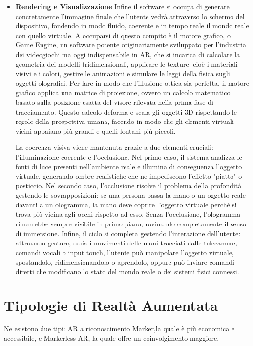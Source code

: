 \begin{itemize}
    \item \textbf{Rendering e Visualizzazione} \newline
    Infine il software si occupa di generare concretamente l'immagine finale che l'utente vedrà attraverso lo schermo del dispositivo, fondendo in modo fluido, coerente e in tempo reale il mondo reale con quello virtuale. A occuparsi di questo compito è il motore grafico, o Game Engine, un software potente originariamente sviluppato per l'industria dei videogiochi ma oggi indispensabile in AR, che si incarica di calcolare la geometria dei modelli tridimensionali, applicare le texture, cioè i materiali visivi e i colori, gestire le animazioni e simulare le leggi della fisica sugli oggetti olografici. Per fare in modo che l'illusione ottica sia perfetta, il motore grafico applica una matrice di proiezione, ovvero un calcolo matematico basato sulla posizione esatta del visore rilevata nella prima fase di tracciamento. Questo calcolo deforma e scala gli oggetti 3D rispettando le regole della prospettiva umana, facendo in modo che gli elementi virtuali vicini appaiano più grandi e quelli lontani più piccoli. \newline

    La coerenza visiva viene mantenuta grazie a due elementi cruciali: l'illuminazione coerente e l'occlusione. Nel primo caso, il sistema analizza le fonti di luce presenti nell'ambiente reale e illumina di conseguenza l'oggetto virtuale, generando ombre realistiche che ne impediscono l'effetto "piatto" o posticcio. Nel secondo caso, l'occlusione risolve il problema della profondità gestendo le sovrapposizioni: se una persona passa la mano o un oggetto reale davanti a un ologramma, la mano deve coprire l'oggetto virtuale perché si trova più vicina agli occhi rispetto ad esso. Senza l'occlusione, l'ologramma rimarrebbe sempre visibile in primo piano, rovinando completamente il senso di immersione. Infine, il ciclo si completa gestendo l'interazione dell'utente: attraverso gesture, ossia i movimenti delle mani tracciati dalle telecamere, comandi vocali o input touch, l'utente può manipolare l'oggetto virtuale, spostandolo, ridimensionandolo o aprendolo, oppure può inviare comandi diretti che modificano lo stato del mondo reale o dei sistemi fisici connessi.


\end{itemize}


\section{Tipologie di Realtà Aumentata}
Ne esistono due tipi: AR a riconoscimento Marker,la quale è più economica e accessibile, e Markerless AR, la quale offre un coinvolgimento maggiore.

